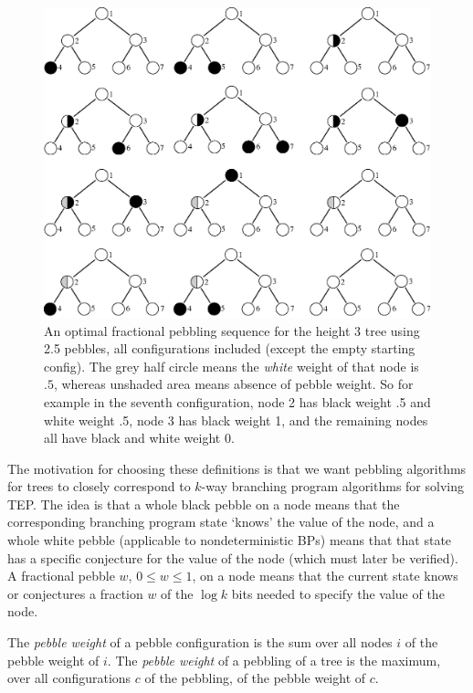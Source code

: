 \documentclass[oribib1]{llncs}
\begin{document}
\begin{figure}
\vspace*{-1.5cm}
\hspace*{1.5cm}\includegraphics[scale=0.70]{bin_h3_fract_ub_full.eps}
\vspace*{-1.5cm}
\caption{An optimal fractional pebbling sequence for the height 3 tree
using 2.5 pebbles, all configurations included (except the empty starting config).
The grey half circle
means the \emph{white} weight of that node is $.5$, whereas unshaded
area means absence of pebble weight. So for example in the seventh
configuration, node 2 has black weight .5 and white weight .5, node 3
has black weight 1, and the remaining nodes all have black and white
weight 0. }
\label{f:bin_h3_fract_ub}
\end{figure}

The motivation for choosing these definitions is that we want
pebbling algorithms for trees to closely correspond to $k$-way
branching program algorithms for solving TEP.  The idea is that
a whole black pebble on a node means that the corresponding branching
program state `knows' the value of the node, and a whole white pebble
(applicable to nondeterministic BPs)
means that that state has a specific conjecture for the value of the
node (which must later be verified).  A fractional pebble $w$,
$0\le w\le 1$, on a node means that the current state knows or conjectures
a fraction $w$ of the $\log k$ bits needed to specify the value of the
node.

The {\em pebble weight} of a pebble configuration is the sum
over all nodes $i$ of the pebble weight of $i$.
The {\em pebble weight} of a pebbling of a tree is the maximum,
over all configurations $c$ of the pebbling, of the pebble weight of $c$.
\end{document}
